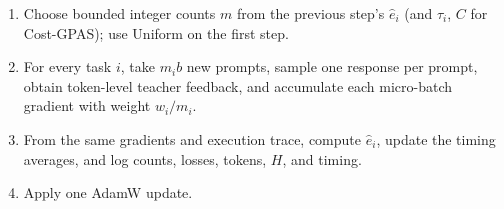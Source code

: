 \begin{algorithm}[H]
\caption{One optimizer step with GPAS.}
\label{alg:batch_gpas}
\small
\begin{minipage}{0.97\linewidth}
\begin{enumerate}
    \item Choose bounded integer counts $m$ from the previous step's
    $\widehat e_i$ (and $\tau_i$, $C$ for Cost-GPAS); use Uniform on the first
    step.
    \item For every task $i$, take $m_ib$ new prompts, sample one response
    per prompt, obtain token-level teacher feedback, and accumulate each
    micro-batch gradient with weight $w_i/m_i$.
    \item From the same gradients and execution trace, compute
    $\widehat e_i$, update the timing averages, and log counts, losses,
    tokens, $H$, and timing.
    \item Apply one AdamW update.
\end{enumerate}
\end{minipage}
\end{algorithm}
